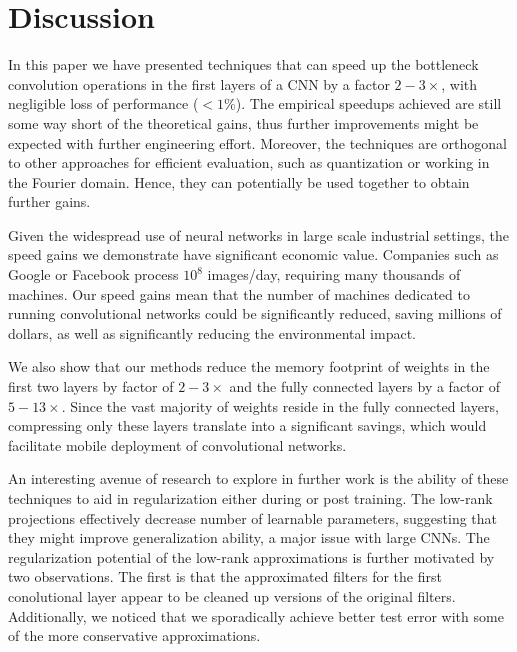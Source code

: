 \section{Discussion}
In this paper we have presented techniques that can speed up the
bottleneck convolution operations in the first layers of a CNN by a factor $2-3\times$, with negligible loss of performance ($< 1\%$). The empirical speedups
achieved are still some way short of the theoretical gains, thus
further improvements might be expected with further engineering effort. 
Moreover, the techniques are orthogonal
to other approaches for efficient evaluation, such as quantization or
working in the Fourier domain. Hence, they can potentially be used
together to obtain further gains. 

Given the widespread use of neural networks in large scale industrial
settings, the speed gains we demonstrate have significant economic
value. Companies such as Google or Facebook process $10^8$ images/day,
requiring many thousands of machines. Our speed gains mean that the
number of machines dedicated to running convolutional networks could be significantly reduced, saving millions of
dollars, as well as significantly reducing the environmental impact.

We also show that our methods reduce the memory footprint of weights
in the first two layers by factor of $2-3\times$ and the fully connected layers by a factor of $5-13\times$.
Since the vast majority of weights reside in the fully connected layers, compressing only these layers 
translate into a significant savings, which would facilitate mobile deployment
of convolutional networks.  


An interesting avenue of research to explore in further work is the ability of these techniques to aid in regularization either during or post training.
The low-rank projections effectively decrease number of learnable parameters,
suggesting that they might improve generalization ability,
a major issue with large CNNs.
The regularization potential of the low-rank approximations is further motivated by two observations. 
The first is that the approximated filters for the first conolutional layer appear to be cleaned up versions of the original filters. 
Additionally, we noticed that we sporadically achieve better
test error with some of the more conservative approximations. 



